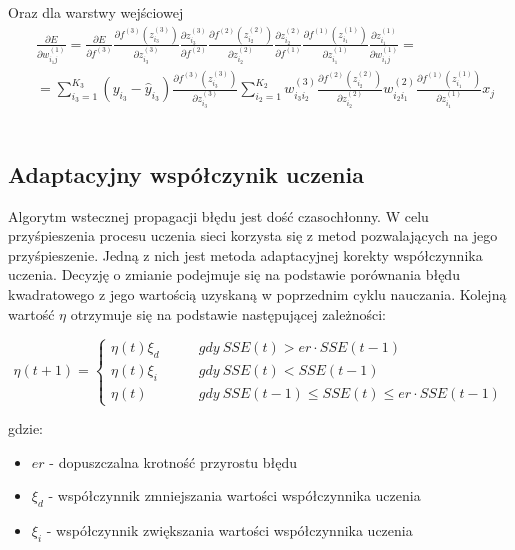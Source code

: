 \documentclass[12pt,twoside]{article}
\begin{document}
Oraz dla warstwy wejściowej\\
\begin{equation}
\begin{aligned}
&\frac{\partial E}{\partial w_{i_{1}j}^{(1)}} = \frac{\partial E}{\partial f^{(3)}} \frac{\partial f^{(3)}\left( z_{i_{3}}^{(3)} \right)}{\partial z_{i_{3}}^{(3)}} \frac{\partial z_{i_{3}}^{(3)}}{\partial f^{(2)}} \frac{\partial f^{(2)}\left( z_{i_{2}}^{(2)} \right)}{\partial z_{i_{2}}^{(2)}} \frac{\partial z_{i_{2}}^{(2)}}{\partial f^{(1)}}  \frac{\partial f^{(1)}\left( z_{i_{1}}^{(1)} \right)}{\partial z_{i_{1}}^{(1)}} \frac{\partial z_{i_{1}}^{(1)}}{\partial w_{i_{1}j}^{(1)}}  =\\
&= \sum_{i_{3}=1}^{K_3}\left( y_{i_{3}} - \hat{y}_{i_{3}} \right) \frac{\partial f^{(3)}\left( z_{i_{3}}^{(3)} \right)}{\partial z_{i_{3}}^{(3)}} \sum_{i_{2}=1}^{K_2} w_{i_{3}i_{2}}^{(3)} \frac{\partial f^{(2)}\left( z_{i_{2}}^{(2)} \right)}{\partial z_{i_{2}}^{(2)}} w_{i_{2}i_{1}}^{(2)} \frac{\partial f^{(1)}\left( z_{i_{1}}^{(1)} \right)}{\partial z_{i_{1}}^{(1)}} x_j
\end{aligned}
\end{equation}
\\
\subsection{Adaptacyjny współczynik uczenia}

Algorytm wstecznej propagacji błędu jest dość czasochłonny. W celu przyśpieszenia procesu uczenia sieci korzysta się z metod pozwalających na jego przyśpieszenie. Jedną z nich jest metoda adaptacyjnej korekty współczynnika uczenia. Decyzję o zmianie podejmuje się na podstawie porównania błędu kwadratowego z jego wartością uzyskaną w poprzednim cyklu nauczania. Kolejną wartość $\eta$ otrzymuje się na podstawie następującej zależności:

\begin{equation}
\eta (t + 1) =
\left\{\begin{aligned}
\eta (t)  \xi_d  & \qquad gdy\ SSE(t) > er \cdot SSE(t - 1)\\
\eta (t)  \xi_i  & \qquad gdy\ SSE(t) < SSE(t - 1)\\
\eta (t)   & \qquad gdy\ SSE(t - 1) \leq SSE(t) \leq er \cdot SSE(t - 1)
\end{aligned}\right.
\end{equation}

gdzie:
\begin{itemize}
\item $er$ - dopuszczalna krotność przyrostu błędu
\item $\xi_d$ - współczynnik zmniejszania wartości współczynnika uczenia
\item $\xi_i$ - współczynnik zwiększania wartości współczynnika uczenia
\end{itemize}
\clearpage
\end{document}
